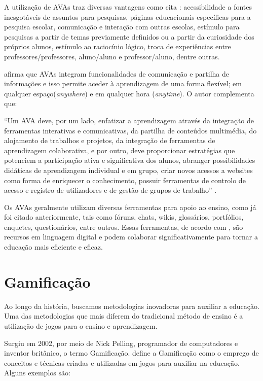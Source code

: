 A utilização de AVAs traz diversas vantagens como cita : acessibilidade a fontes inesgotáveis de assuntos para pesquisas, páginas educacionais específicas para a pesquisa escolar, comunicação e interação com outras escolas, estímulo para pesquisas a partir de temas previamente definidos ou a partir da curiosidade dos próprios alunos, estímulo ao raciocínio lógico, troca de experiências entre professores/professores, aluno/aluno e professor/aluno, dentre outras.

 afirma que AVAs integram funcionalidades de comunicação e partilha de informações e isso permite aceder à aprendizagem de uma forma flexível; em qualquer espaço(\textit{anywhere}) e em qualquer hora (\textit{anytime}). O autor complementa que:

\begin{citacao}
``Um AVA deve, por um lado, enfatizar a aprendizagem através da integração de ferramentas interativas e comunicativas, da partilha de conteúdos multimédia, do alojamento de trabalhos e projetos, da integração de ferramentas de aprendizagem colaborativa, e por outro, deve proporcionar estratégias que potenciem a participação ativa e significativa dos alunos, abranger possibilidades didáticas de aprendizagem individual e em grupo, criar novos acessos a websites como forma de enriquecer o conhecimento, possuir ferramentas de controlo de acesso e registro de utilizadores e de gestão de grupos de trabalho'' \cite[p.~41]{carvalho2013ambiente}. 
\end{citacao}

Os AVAs  geralmente utilizam diversas ferramentas para apoio ao ensino, como já foi citado anteriormente, tais como fóruns, chats, wikis, glossários, portfólios, enquetes, questionários, entre outros. Essas ferramentas, de acordo com , são recursos em linguagem digital e podem colaborar significativamente para tornar a educação mais eficiente e eficaz.

\section{Gamificação}

Ao longo da história, buscamos metodologias inovadoras para auxiliar a educação. Uma das metodologias que mais diferem do tradicional método de ensino é a utilização de jogos para o ensino e aprendizagem. 

Surgiu em 2002, por meio de Nick Pelling, programador de computadores e inventor britânico, o termo Gamificação.  define a Gamificação como o emprego de conceitos e 
técnicas criadas e utilizadas em jogos para auxiliar na educação. Alguns exemplos s\~ao:

